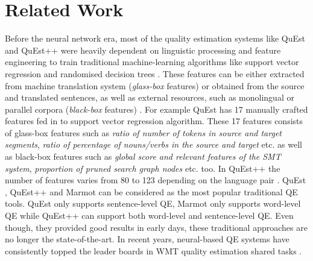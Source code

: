 \section{Related Work}
\label{sec:qe_related}
Before the neural network era, most of the quality estimation systems like QuEst \autocite{specia-etal-2013-quest} and QuEst++ \autocite{specia-etal-2015-multi} were heavily dependent on linguistic processing and feature engineering to train traditional machine-learning algorithms like support vector regression and randomised decision trees \autocite{specia-etal-2013-quest}. These features can be either extracted from machine translation system (\textit{glass-box} features) or obtained from
the source and translated sentences, as well as external resources, such as monolingual or parallel corpora (\textit{black-box} features) \autocite{specia-etal-2009-estimating}. For example QuEst \autocite{specia-etal-2013-quest} has 17 manually crafted features fed in to support vector regression algorithm. These 17 features consists of glass-box features such as \textit{ratio of number of tokens in source and target segments}, \textit{ratio of percentage of nouns/verbs in the source and target} etc. as well as black-box features such as \textit{global score and relevant features of the SMT system}, \textit{proportion of pruned search graph nodes} etc. too. In QuEst++ the number of features varies from 80 to 123 depending on the language pair \autocite{specia-etal-2015-multi}. QuEst \autocite{specia-etal-2013-quest}, QuEst++ \autocite{specia-etal-2015-multi} and Marmot \autocite{logacheva-etal-2016-marmot} can be considered as the most popular traditional QE tools. QuEst \autocite{specia-etal-2013-quest} only supports sentence-level QE, Marmot \autocite{logacheva-etal-2016-marmot} only supports word-level QE while QuEst++ \autocite{specia-etal-2015-multi} can support both word-level and sentence-level QE. Even though, they provided good results in early days, these traditional approaches are no longer the state-of-the-art. In recent years, neural-based QE systems have consistently topped the leader boards in WMT quality estimation shared tasks  \autocite{kepler-etal-2019-openkiwi}. 

